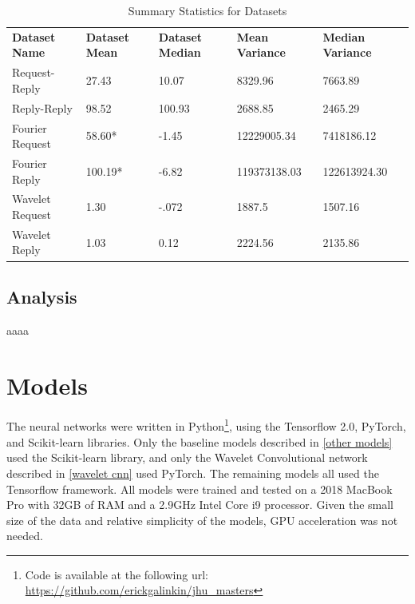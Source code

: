 \documentclass[10pt]{article}
\begin{document}
\begin{table}[]
\caption{Summary Statistics for Datasets}
\centering
\label{Tab:summary}	

\begin{tabular}{lllll}
\textbf{Dataset Name} & \textbf{Dataset Mean} & \textbf{Dataset Median} & \textbf{Mean Variance} & \textbf{Median Variance} \\
Request-Reply         & 27.43                 & 10.07                   & 8329.96                & 7663.89                  \\
Reply-Reply           & 98.52                 & 100.93                  & 2688.85                & 2465.29                  \\
Fourier Request       & 58.60*                & -1.45                   & 12229005.34            & 7418186.12               \\
Fourier Reply         & 100.19*               & -6.82                   & 119373138.03           & 122613924.30             \\
Wavelet Request       & 1.30                  & -.072                   & 1887.5                 & 1507.16                  \\
Wavelet Reply         & 1.03                  & 0.12                    & 2224.56                & 2135.86                 
\end{tabular}
\end{table}

\subsection{Analysis}
aaaa

\section{Models}
The neural networks were written in Python\footnote{Code is available at the following url: \url{https://github.com/erickgalinkin/jhu_masters}}, using the Tensorflow 2.0, PyTorch, and Scikit-learn libraries.
Only the baseline models described in \ref{other models} used the Scikit-learn library, and only the Wavelet Convolutional network described in \ref{wavelet cnn} used PyTorch.
The remaining models all used the Tensorflow framework.
All models were trained and tested on a 2018 MacBook Pro with 32GB of RAM and a 2.9GHz Intel Core i9 processor.
Given the small size of the data and relative simplicity of the models, GPU acceleration was not needed.
\end{document}
